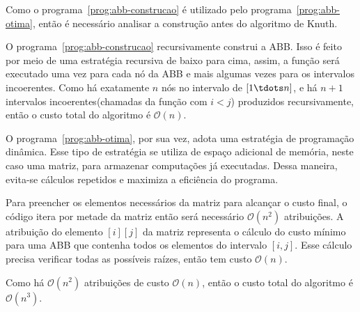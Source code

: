 Como o programa~\ref{prog:abb-construcao} é utilizado pelo programa~\ref{prog:abb-otima}, então é necessário analisar a construção antes do algoritmo de Knuth.

O programa~\ref{prog:abb-construcao} recursivamente construi a ABB. Isso é feito por meio de uma estratégia recursiva de baixo para cima, assim, a função será executado uma vez para cada nó da ABB e mais algumas vezes para os intervalos incoerentes. Como há exatamente $n$ nós no intervalo de $[1 \tdots n]$, e há $n+1$ intervalos incoerentes(chamadas da função com $i<j$) produzidos recursivamente, então o custo total do algoritmo é \( \mathcal{O}(n) \).

O programa~\ref{prog:abb-otima}, por sua vez, adota uma estratégia de programação dinâmica. Esse tipo de estratégia se utiliza de espaço adicional de memória, neste caso uma matriz, para armazenar computações já executadas. Dessa maneira, evita-se cálculos repetidos e maximiza a eficiência do programa.

Para preencher os elementos necessários da matriz para alcançar o custo final, o código itera por metade da matriz então será necessário \( \mathcal{O}(n^2) \) atribuições. A atribuição do elemento $[i][j]$ da matriz representa o cálculo do custo mínimo para uma ABB que contenha todos os elementos do intervalo $[i,j]$. Esse cálculo precisa verificar todas as possíveis raízes, então tem custo \( \mathcal{O}(n) \). 

Como há \( \mathcal{O}(n^2) \) atribuições de custo \( \mathcal{O}(n) \), então o custo total do algoritmo é \( \mathcal{O}(n^3) \). 



